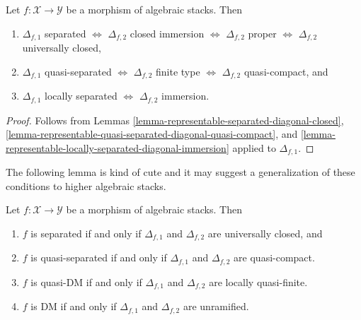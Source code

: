 \begin{lemma}
\label{lemma-first-diagonal-separated-second-diagonal-closed}
Let $f : \mathcal{X} \to \mathcal{Y}$ be a morphism of algebraic stacks.
Then
\begin{enumerate}
\item $\Delta_{f, 1}$ separated $\Leftrightarrow$
$\Delta_{f, 2}$ closed immersion $\Leftrightarrow$
$\Delta_{f, 2}$ proper $\Leftrightarrow$
$\Delta_{f, 2}$ universally closed,
\item $\Delta_{f, 1}$ quasi-separated $\Leftrightarrow$
$\Delta_{f, 2}$ finite type $\Leftrightarrow$ $\Delta_{f, 2}$ quasi-compact,
and
\item $\Delta_{f, 1}$ locally separated $\Leftrightarrow$
$\Delta_{f, 2}$ immersion.
\end{enumerate}
\end{lemma}

\begin{proof}
Follows from
Lemmas \ref{lemma-representable-separated-diagonal-closed},
\ref{lemma-representable-quasi-separated-diagonal-quasi-compact}, and
\ref{lemma-representable-locally-separated-diagonal-immersion}
applied to $\Delta_{f, 1}$.
\end{proof}

\noindent
The following lemma is kind of cute and it may suggest a generalization
of these conditions to higher algebraic stacks.

\begin{lemma}
\label{lemma-definition-separated}
Let $f : \mathcal{X} \to \mathcal{Y}$ be a morphism of algebraic stacks.
Then
\begin{enumerate}
\item $f$ is separated if and only if $\Delta_{f, 1}$ and $\Delta_{f, 2}$
are universally closed, and
\item $f$ is quasi-separated if and only if $\Delta_{f, 1}$ and $\Delta_{f, 2}$
are quasi-compact.
\item $f$ is quasi-DM if and only if $\Delta_{f, 1}$ and $\Delta_{f, 2}$
are locally quasi-finite.
\item $f$ is DM if and only if $\Delta_{f, 1}$ and $\Delta_{f, 2}$
are unramified.
\end{enumerate}
\end{lemma}

